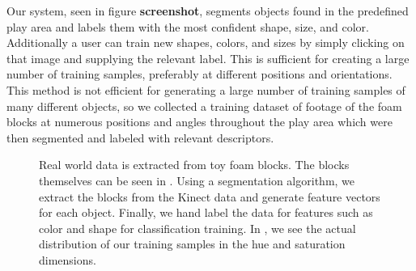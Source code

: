 \documentclass[11pt]{article}
\newcommand{\meh}[1]{{\bf \color{blue} #1}}
\begin{document}
{Our system, seen in figure \meh{screenshot}, segments objects found in the
predefined play area and labels them with the most confident shape, size, and
color.  Additionally a user can train new shapes, colors, and sizes by simply
clicking on that image and supplying the relevant label.  This is sufficient
for creating a large number of training samples, preferably at different
positions and orientations.  This method is not efficient for generating a
large number of training samples of many different objects, so we collected a
training dataset of footage of the foam blocks at numerous positions and angles
throughout the play area which were then segmented and labeled with relevant
descriptors.


\begin{figure}[h!]
\centering
{}
\caption{Real world data is extracted from toy foam blocks. The blocks
    themselves can be seen in . Using a segmentation
    algorithm, we extract the blocks from the Kinect data 
    and generate feature vectors for each object.
    Finally, we hand label the data for features such as color and shape for
    classification training. In , we see the actual
    distribution of our training samples in the hue and saturation
    dimensions.}
\label{fig:objects}
\end{figure}


}
\end{document}
